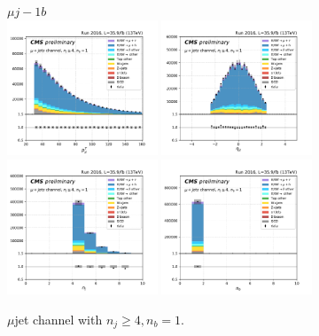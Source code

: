 \begin{figure}[ht]
    \centering
    $\mu j- 1b$ \\
    \includegraphics[width=0.4\textwidth]{chapters/Analysis/sectionPlots/figures/kinematics_pickles/mu4j/1b/mu4j_1b_lepton1_pt.pdf}
    \includegraphics[width=0.4\textwidth]{chapters/Analysis/sectionPlots/figures/kinematics_pickles/mu4j/1b/mu4j_1b_lepton1_eta.pdf}
    \includegraphics[width=0.4\textwidth]{chapters/Analysis/sectionPlots/figures/kinematics_pickles/mu4j/1b/mu4j_1b_nJets.pdf}
    \includegraphics[width=0.4\textwidth]{chapters/Analysis/sectionPlots/figures/kinematics_pickles/mu4j/1b/mu4j_1b_nBJets.pdf}
    
    \caption{$\mu$jet channel with $n_j\geq4, n_b=1$.}
\end{figure}

